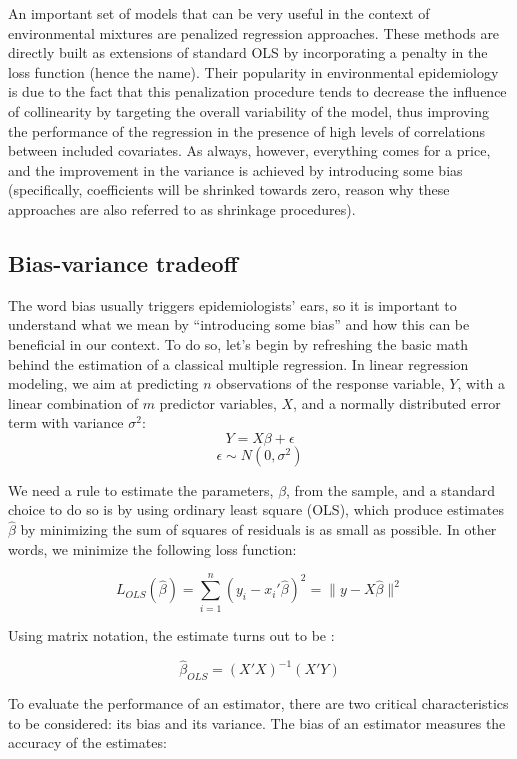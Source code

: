 \documentclass[
]{book}
\begin{document}
An important set of models that can be very useful in the context of environmental mixtures are penalized regression approaches. These methods are directly built as extensions of standard OLS by incorporating a penalty in the loss function (hence the name). Their popularity in environmental epidemiology is due to the fact that this penalization procedure tends to decrease the influence of collinearity by targeting the overall variability of the model, thus improving the performance of the regression in the presence of high levels of correlations between included covariates. As always, however, everything comes for a price, and the improvement in the variance is achieved by introducing some bias (specifically, coefficients will be shrinked towards zero, reason why these approaches are also referred to as shrinkage procedures).

\hypertarget{bias-variance-tradeoff}{%
\subsection{Bias-variance tradeoff}\label{bias-variance-tradeoff}}

The word bias usually triggers epidemiologists' ears, so it is important to understand what we mean by ``introducing some bias'' and how this can be beneficial in our context. To do so, let's begin by refreshing the basic math behind the estimation of a classical multiple regression. In linear regression modeling, we aim at predicting \(n\) observations of the response variable, \(Y\), with a linear combination of \(m\) predictor variables, \(X\), and a normally distributed error term with variance \(\sigma^2\):
\[Y=X\beta+\epsilon\]
\[\epsilon\sim N(0, \sigma^2)\]

We need a rule to estimate the parameters, \(\beta\), from the sample, and a standard choice to do so is by using ordinary least square (OLS), which produce estimates \(\hat{\beta}\) by minimizing the sum of squares of residuals is as small as possible. In other words, we minimize the following loss function:

\[L_{OLS}(\hat{\beta})=\sum_{i=1}^n(y_i-x_i'\hat{\beta})^2=\|y-X\hat{\beta}\|^2\]

Using matrix notation, the estimate turns out to be :

\[\hat{\beta}_{OLS}=(X'X)^{-1}(X'Y)\]

To evaluate the performance of an estimator, there are two critical characteristics to be considered: its bias and its variance. The bias of an estimator measures the accuracy of the estimates:
\end{document}
